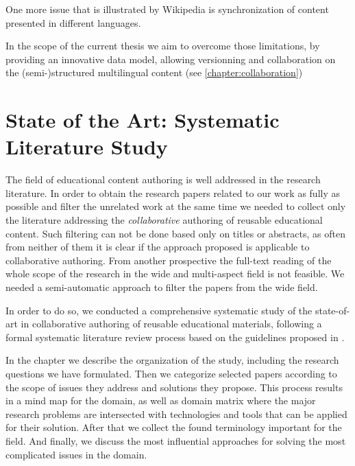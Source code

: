\documentclass[ngerman,UKenglish,table]{scrbook}
\begin{document}
One more issue that is illustrated by Wikipedia is synchronization of content presented in different languages.

In the scope of the current thesis we aim to overcome those limitations, by providing an innovative data model, allowing versionning and collaboration on the (semi-)structured multilingual content (see \autoref{chapter:collaboration})



\chapter{State of the Art: Systematic Literature Study}
\label{chapter:related_work}
The field of educational content authoring is well addressed in the research literature.
In order to obtain the research papers related to our work as fully as possible and filter the unrelated work at the same time we needed to collect only the literature addressing the \emph{collaborative} authoring of reusable educational content.
Such filtering can not be done based only on titles or abstracts, as often from neither of them it is clear if the approach proposed is applicable to collaborative authoring.
From another prospective the full-text reading of the whole scope of the research in the wide and multi-aspect field is not feasible.
We needed a semi-automatic approach to filter the papers from the wide field.

In order to do so, we conducted a comprehensive systematic study of the state-of-art in collaborative authoring of reusable educational materials, 
following a formal systematic literature review process based on the guidelines proposed in \cite{Dyba2007, Kitchenham2004}.

In the chapter we describe the organization of the study, including the research questions we have formulated.
Then we categorize selected papers according to the scope of issues they address and solutions they propose. 
This process results in a mind map for the domain, as well as domain matrix where the major research problems are intersected with technologies and tools that can be applied for their solution.
After that we collect the found terminology important for the field.
And finally, we discuss the most influential approaches for solving the most complicated issues in the domain.

\end{document}
